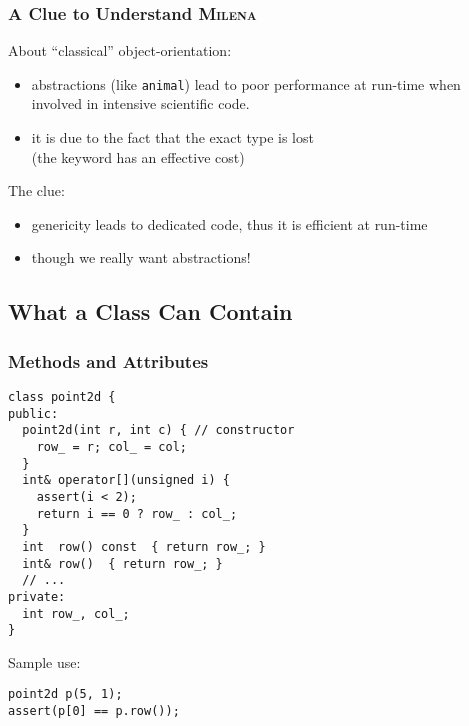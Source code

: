 \documentclass{beamer}
\newcommand{\kw}[1]{{\color{blue}{\texttt{#1}}}\xspace}
\newcommand{\code}[1]{{\scriptsize{\texttt{#1}}}\xspace}
\newcommand{\mln}{\textsc{Milena}\xspace}
\begin{document}
\begin{frame}
  \frametitle{A Clue to Understand \mln}

  About ``classical'' object-orientation:

  \begin{itemize}
  \item abstractions (like \code{animal}) lead to poor
    performance at run-time when involved in intensive scientific code.
  \item it is due to the fact that the exact type is lost\\
    (the \kw{virtual} keyword has an effective cost)
  \end{itemize}
  
  \smallskip

  The clue:

  \begin{itemize}
  \item genericity leads to dedicated code, thus it is efficient at run-time
  \item though we really want abstractions!
  \end{itemize}
  

\end{frame}



\subsection{What a Class Can Contain}



\begin{frame}[fragile]
  \frametitle{Methods and Attributes}

\begin{lstlisting}
class point2d {
public:
  point2d(int r, int c) { // constructor
    row_ = r; col_ = col;
  }
  int& operator[](unsigned i) {
    assert(i < 2);
    return i == 0 ? row_ : col_;
  }
  int  row() const  { return row_; }
  int& row()  { return row_; }
  // ...
private:
  int row_, col_;
}
\end{lstlisting}

Sample use:
\begin{lstlisting}
point2d p(5, 1);
assert(p[0] == p.row());
\end{lstlisting}

\end{frame}
\end{document}
